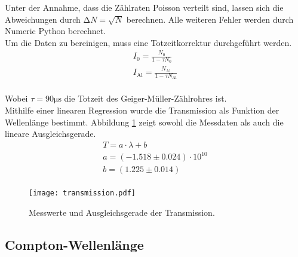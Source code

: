 \noindent Unter der Annahme, dass die Zählraten Poisson verteilt sind,
lassen sich die Abweichungen durch $\increment N = \sqrt{N}$ berechnen.
Alle weiteren Fehler werden durch Numeric Python berechnet.\\
Um die Daten zu bereinigen, muss eine Totzeitkorrektur
durchgeführt werden. 
\begin{align*}
    I_0 = \frac{N_0}{1 - \tau N_0}\\
    I_\text{Al} = \frac{N_\text{Al}}{1 - \tau N_\text{Al}}\\
\end{align*}

\noindent Wobei $\tau = 90 \si{\micro\s}$ die Totzeit des Geiger-Müller-Zählrohres 
ist.\\
Mithilfe einer linearen Regression wurde die Transmission als Funktion 
der Wellenlänge bestimmt. Abbildung \ref{fig:transmission} zeigt sowohl
die Messdaten als auch die lineare Ausgleichsgerade.
\begin{align*}
    T = a \cdot \lambda + b \\
    a = \left( - 1.518 \pm 0.024 \right) \cdot 10^{10} \\
    b = \left( 1.225 \pm 0.014 \right)\\
\end{align*}

\begin{figure}
    \centering
    \texttt{[image: transmission.pdf]}
    \caption{Messwerte und Ausgleichsgerade der Transmission.}
    \label{fig:transmission}
\end{figure}

\subsection{Compton-Wellenlänge}


